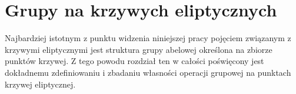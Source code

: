 \chapter{Grupy na krzywych eliptycznych}

Najbardziej istotnym z punktu widzenia niniejszej pracy
pojęciem związanym z krzywymi eliptycznymi
jest struktura grupy abelowej
określona na zbiorze punktów krzywej.
Z tego powodu rozdział ten w całości poświęcony jest
dokładnemu zdefiniowaniu i zbadaniu własności
operacji grupowej na punktach krzywej eliptycznej.






